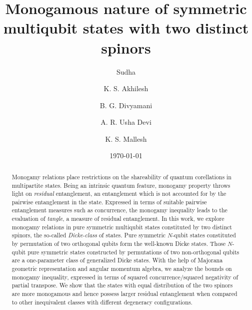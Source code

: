 \documentclass[pra,a4paper,showpacs,superscriptaddress]{revtex4}
\begin{document}
\title{Monogamous nature of symmetric multiqubit states with two distinct spinors} 
\author{Sudha} 
\author{K. S. Akhilesh }
\author{B. G. Divyamani} 
\author{A. R. Usha Devi}
\author{K. S. Mallesh} 
\date{\today}

\begin{abstract} 
Monogamy relations place restrictions on the shareability of quantum corellations in multipartite states. Being an intrinsic quantum feature, monogamy property throws light on {\emph{residual}} entanglement, an entanglement which is not accounted for by the pairwise entanglement in the state. Expressed in terms of suitable pairwise entanglement measures such as concurrence, the monogamy inequality leads to the evaluation of {\emph{tangle}}, a measure of residual entanglement.  In this work, we explore monogamy relations in pure symmetric multiqubit states constituted by two distinct spinors, the so-called {\emph{Dicke-class}} of states. Pure symmetric $N$-qubit states constituted by permutation of two orthogonal qubits form the well-known Dicke states. Those $N$-qubit pure symmetric states constructed by permutations of two non-orthogonal qubits are a one-parameter class of generalized Dicke states. With the help of Majorana geometric representation and angular momentum algebra, we analyze the bounds on monogamy inequality, expressed in terms of  squared concurrence/squared negativity of partial transpose. We show that the states with equal distribution of the two spinors are more monogamous and hence possess larger residual entanglement when compared to other inequivalent classes with different degeneracy configurations.  
\end{abstract}
\maketitle
\end{document}
